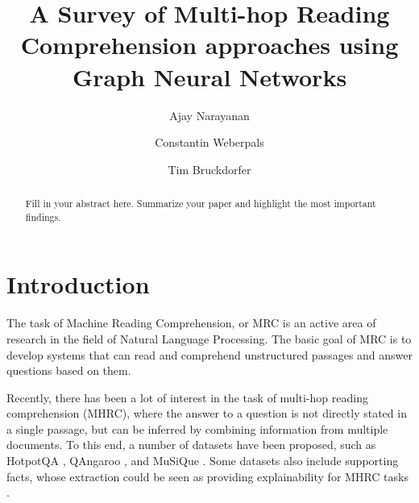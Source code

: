 \documentclass[sigplan,screen]{acmart}
\begin{document}
\title{A Survey of Multi-hop Reading Comprehension approaches using Graph Neural Networks}

\author{Ajay Narayanan}

\author{Constantin Weberpals}

\author{Tim Bruckdorfer}



\begin{abstract}
  Fill in your abstract here. Summarize your paper and highlight the most important findings.
\end{abstract}

\maketitle

\section{Introduction}
The task of Machine Reading Comprehension, or MRC is an active area of research in the field of Natural Language Processing. 
The basic goal of MRC is to develop systems that can read and comprehend unstructured passages and answer questions based on them. 

Recently, there has been a lot of interest in the task of multi-hop reading comprehension (MHRC), 
where the answer to a question is not directly stated in a single passage, but can be inferred by combining information from multiple documents.
To this end, a number of datasets have been proposed, such as HotpotQA \cite{RN116}, QAngaroo \cite{RN115}, and MuSiQue \cite{RN167}. Some datasets 
also include supporting facts, whose extraction could be seen as providing explainability for MHRC tasks  \cite{RN116} \cite{RN106}.
\end{document}

